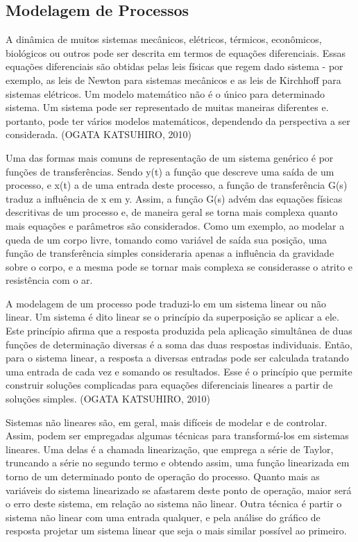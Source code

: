 \subsection{Modelagem de Processos}

A dinâmica de muitos sistemas  mecânicos, elétricos, térmicos, econômicos, biológicos ou outros pode ser descrita em termos de equações diferenciais. Essas equações diferenciais são obtidas pelas leis físicas que regem dado sistema - por exemplo, as leis de Newton para sistemas mecânicos e as leis de Kirchhoff para sistemas elétricos. Um modelo matemático não é o único para determinado sistema. Um sistema pode ser representado de muitas maneiras diferentes e. portanto, pode ter vários modelos matemáticos, dependendo da perspectiva a ser considerada. (OGATA KATSUHIRO, 2010)

Uma das formas mais comuns de representação de um sistema genérico é por funções de transferências. Sendo y(t) a função que descreve uma saída de um processo, e x(t) a de uma entrada deste processo, a função de transferência G(s) traduz a influência de x em y. Assim, a função G(s) advém das equações físicas descritivas de um processo e, de maneira geral se torna mais complexa quanto mais equações e parâmetros são considerados. Como um exemplo, ao modelar a queda de um corpo livre, tomando como variável de saída sua posição, uma função de transferência simples consideraria apenas a influência da gravidade sobre o corpo, e a mesma pode se tornar mais complexa se considerasse o atrito e resistência com o ar.

A modelagem de um processo pode traduzi-lo em um sistema linear ou não linear. Um sistema é dito linear se o princípio da superposição se aplicar a ele. Este princípio afirma que a resposta produzida pela aplicação simultânea de duas funções de determinação diversas é a soma das duas respostas individuais. Então, para o sistema linear, a resposta a diversas entradas pode ser calculada tratando uma entrada de cada vez e somando os resultados. Esse é o princípio que permite construir soluções complicadas para equações diferenciais lineares a partir de soluções simples. (OGATA KATSUHIRO, 2010)

Sistemas não lineares são, em geral, mais difíceis de modelar e de controlar. Assim, podem ser empregadas algumas técnicas para transformá-los em sistemas lineares. Uma delas é a chamada linearização, que emprega a série de Taylor, truncando a série no segundo termo e obtendo assim, uma função linearizada em torno de um determinado ponto de operação do processo. Quanto mais as variáveis do sistema linearizado se afastarem deste ponto de operação, maior será o erro deste sistema, em relação ao sistema não linear. Outra técnica é partir o sistema não linear com uma entrada qualquer, e pela análise do gráfico de resposta projetar um sistema linear que seja o mais similar possível ao primeiro.

